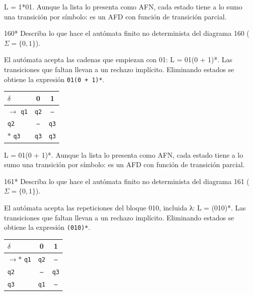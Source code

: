 \documentclass[11pt]{article}
\begin{document}
\resp L = 1*01. Aunque la lista lo presenta como AFN, cada estado tiene a lo sumo una transición por símbolo: es un AFD con función de transición parcial.


\begin{ejercicio}{160}{*}
Describa lo que hace el autómata finito no determinista del diagrama 160 ($\Sigma = \{0, 1\}$).
\end{ejercicio}
\proc El autómata acepta las cadenas que empiezan con 01: L = 01(0 + 1)*. Las transiciones que faltan llevan a un rechazo implícito. Eliminando estados se obtiene la expresión \texttt{01(0 + 1)*}.
\begin{center}\small\begin{tabular}{lcc}\toprule
$\delta$ & 0 & 1 \\\midrule
$\to$ \texttt{q1} & \texttt{q2} & \texttt{--} \\
 \texttt{q2} & \texttt{--} & \texttt{q3} \\
$*$ \texttt{q3} & \texttt{q3} & \texttt{q3} \\
\bottomrule\end{tabular}\end{center}

\resp L = 01(0 + 1)*. Aunque la lista lo presenta como AFN, cada estado tiene a lo sumo una transición por símbolo: es un AFD con función de transición parcial.


\begin{ejercicio}{161}{*}
Describa lo que hace el autómata finito no determinista del diagrama 161 ($\Sigma = \{0, 1\}$).
\end{ejercicio}
\proc El autómata acepta las repeticiones del bloque 010, incluida λ: L = (010)*. Las transiciones que faltan llevan a un rechazo implícito. Eliminando estados se obtiene la expresión \texttt{(010)*}.
\begin{center}\small\begin{tabular}{lcc}\toprule
$\delta$ & 0 & 1 \\\midrule
$\to$$*$ \texttt{q1} & \texttt{q2} & \texttt{--} \\
 \texttt{q2} & \texttt{--} & \texttt{q3} \\
 \texttt{q3} & \texttt{q1} & \texttt{--} \\
\bottomrule\end{tabular}\end{center}
\end{document}
